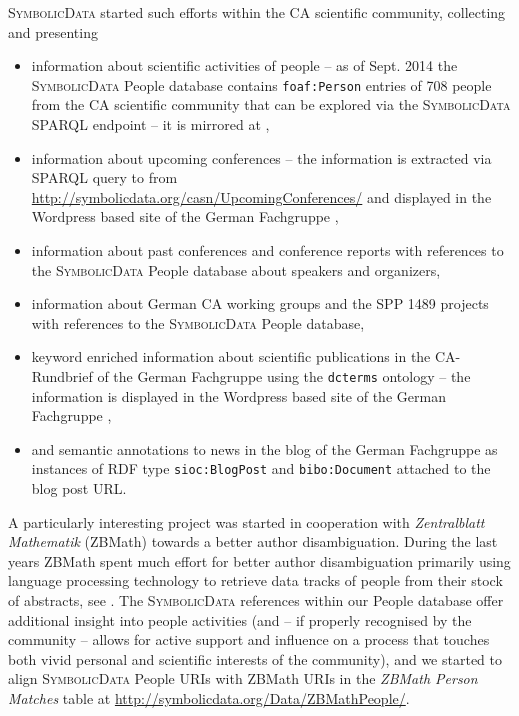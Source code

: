 \documentclass[a4paper,11pt]{article}
\def\SD{\textsc{SymbolicData}}
\begin{document}
\begin{multicols}{2}
{\SD} started such efforts within the CA scientific community, collecting and
presenting
\begin{itemize}
\item information about scientific activities of people -- as of Sept. 2014 the
  {\SD} People database contains \texttt{foaf:Person} entries of 708 people
  from the CA scientific community that can be explored via the {\SD} SPARQL
  endpoint \cite{sdsparql} -- it is mirrored at \cite{casnsparql},
\item information about upcoming conferences -- the information is extracted
  via SPARQL query to \cite{casnsparql} from
  \url{http://symbolicdata.org/casn/UpcomingConferences/} and displayed in the
  Wordpress based site of the German Fachgruppe \cite{cafg},
\item information about past conferences and conference reports with references
  to the {\SD} People database about speakers and organizers, 
\item information about German CA working groups and the SPP 1489 projects with
  references to the {\SD} People database,
\item keyword enriched information about scientific publications in the
  CA-Rundbrief of the German Fachgruppe using the \texttt{dcterms} ontology --
  the information is displayed in the Wordpress based site of the German
  Fachgruppe \cite{cafg}, 
\item and semantic annotations to news in the blog of the German Fachgruppe as
  instances of RDF type \texttt{sioc:BlogPost} and \texttt{bibo:Document}
  attached to the blog post URL. 
\end{itemize}
A particularly interesting project was started in cooperation with
\emph{Zentralblatt Mathematik} (ZBMath) towards a better author
disambiguation.  During the last years ZBMath spent much effort for better
author disambiguation primarily using language processing technology to
retrieve data tracks of people from their stock of abstracts, see
\cite{postagging}.  The {\SD} references within our People database offer
additional insight into people activities (and -- if properly recognised by
the community -- allows for active support and influence on a process that
touches both vivid personal and scientific interests of the community), and we
started to align {\SD} People URIs with ZBMath URIs in the \emph{ZBMath Person
  Matches} table at \url{http://symbolicdata.org/Data/ZBMathPeople/}.


\end{multicols}
\end{document}
